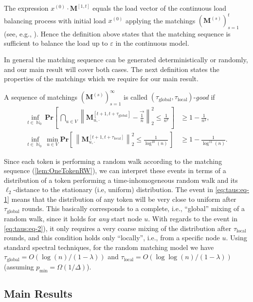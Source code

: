 \documentclass[twoside,leqno]{article}
\DeclareMathOperator{\N}{\mathbb{N}}
\newcommand{\Pro}[1]{\mathbf{Pr} \left[\,#1\,\right]}
\newcommand{\M}{\mathbf{M}}
\DeclareMathOperator{\1}{\mathbf{1}}
\newcommand{\taulocal}{\tau_{\mathrm{local}}}
\newcommand{\tauglobal}{\tau_{\mathrm{global}}}
\numberwithin{equation}{section}
\let\epsilon\varepsilon
\begin{document}
The expression $x^{(0)}\cdot \M^{[1,t]}$ equals the load vector of the continuous load balancing process with initial load $x^{(0)}$ applying the matchings $\left(\M^{(s)}\right)_{s=1}^{t}$ (see, e.g., \cite{DBLP:conf/focs/RabaniSW98}).
Hence the definition above states that the matching sequence is sufficient to balance the load up to $\epsilon$ in the continuous model. 

In general the matching sequence can be generated deterministically or randomly, and our main result will cover both cases. 
The next definition states the properties of the matchings which we require for our main result.

\begin{definition}\label{def:taus}
A sequence of matchings $\left(\M^{(s)}\right)_{s=1}^{\infty}$ is called $(\tauglobal,\taulocal)$-\emph{good} if
\begin{align}
\inf_{t \in \N_{0}} \Pro{ \bigcap_{u \in V} \left\| \M_{u,\cdot}^{[t+1,t+\tauglobal]} - \vec{ \frac{1}{n}} \right\|_2^2 \leq \frac{1}{n^7}} &\ge 1-\frac{1}{n^3}
\label{eq:taus:eq-1}, \\
\inf_{t \in \N_{0}} \min_{u \in V} \Pro{ \left\| \M_{u,\cdot}^{[t+1,t+\taulocal]} \right\|_2^2 \leq \frac{1}{\log^{10}(n)}} &\ge 1- \frac{1}{\log^{11}(n)}.\label{eq:taus:eq-2}
\end{align}
\end{definition}
Since each token is performing a random walk according to the matching sequence (\cref{lem:OneTokenRW}), we can interpret these events in terms of a distribution of a token performing a time-inhomogeneous random walk and its $\ell_2$-distance to the stationary (i.e, uniform) distribution. The event in \cref{eq:taus:eq-1} means that the distribution of any token will be very close to uniform after $\tauglobal$ rounds.  
This basically corresponds to a complete, i.e., ``global'' mixing of a random walk, since it holds for \emph{any} start node $u$.
With regards to the event in \cref{eq:taus:eq-2}), it only requires a very coarse mixing of the distribution after $\taulocal$ rounds, and this condition holds only ``locally'', i.e., from a specific node $u$. 
Using standard spectral techniques, for the random matching model we have $\tauglobal = O( \log(n)/(1-\lambda))$ and $\taulocal=O(\log \log(n)/(1-\lambda))$ (assuming
 $p_{\min}=\Omega(1/\Delta)$). 


\subsection{Main Results}\label{sec:mainresintro}
\end{document}

